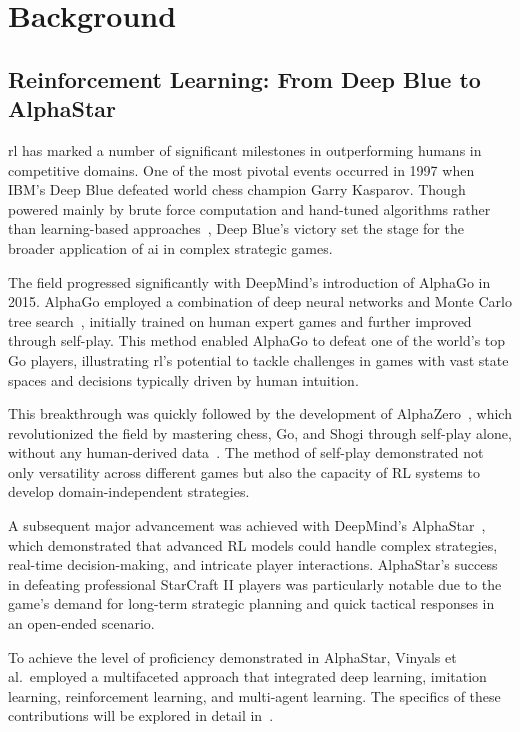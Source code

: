 \section{Background}%
\label{sec:background}

    \subsection*{Reinforcement Learning: From Deep Blue to AlphaStar}

\gls{rl} has marked a number of significant milestones in outperforming humans in competitive domains.
One of the most pivotal events occurred in 1997 when IBM's Deep Blue defeated world chess champion
Garry Kasparov. Though powered mainly by brute force computation and hand-tuned algorithms rather
than learning-based approaches~\cite{campbell2002},
Deep Blue's victory set the stage for the broader application of \gls{ai} in complex strategic games.

The field progressed significantly with DeepMind's introduction of AlphaGo in 2015.
AlphaGo employed a combination of deep neural networks and Monte Carlo tree search~\cite{silver2016},
initially trained on human expert games and further improved through self-play.
This method enabled AlphaGo to defeat one of the world's top Go players, illustrating \gls{rl}'s
potential to tackle challenges in games with vast state spaces and decisions typically driven by
human intuition.

This breakthrough was quickly followed by the development of AlphaZero~\cite{silver2017},
which revolutionized the field by mastering chess, Go, and Shogi through self-play alone,
without any human-derived data~\cite{silver2017a}.
The method of self-play demonstrated not only versatility across different games but also the
capacity of RL systems to develop domain-independent strategies.

A subsequent major advancement was achieved with DeepMind's AlphaStar~\cite{vinyals2019},
which demonstrated that advanced RL models could handle complex strategies,
real-time decision-making, and intricate player interactions. AlphaStar's success in 
defeating professional StarCraft II players was particularly notable due to the game's demand 
for long-term strategic planning and quick tactical responses in an open-ended scenario.

To achieve the level of proficiency demonstrated in AlphaStar, Vinyals et al.~employed a 
multifaceted approach that integrated deep learning, imitation learning, reinforcement learning, 
and multi-agent learning. The specifics of these contributions will be explored in 
detail in~.


